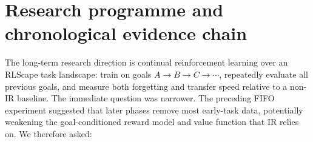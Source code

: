 \documentclass[10pt]{article}
\newcommand{\pct}[1]{#1\%}
\begin{document}
\begin{abstract}
Study XII autopsies that bury failure over 2,010 sampled episodes. Always-on reward-only IR raises success from \pct{34.0} to \pct{60.7}, and a 127-update cap reaches \pct{61.3}; caps of 16--80 updates instead fall to \pct{11.3}--\pct{20.7}. Randomly distributing at most 46 updates reaches \pct{54.0}, while the virtual-positive selector reaches exactly zero despite committing 48.6 updates per episode. Inverting its decision recovers only \pct{17.3}. An exact $\beta=.005$ value mixture is not a safe regularizer: always-on mixed IR also reaches zero, although random scheduling again reaches \pct{54.0}. Thus the catastrophe combines a partial-repair region with harmful selection and extreme seed sensitivity. A dedicated world-model audit does not pass its no-intervention check (only \pct{14.3} paired action agreement), so reward-model exploitation remains plausible but unproven. The combined result is a constructive negative: reward-only IR is a strong recovery operator, but the present world model cannot yet safely judge the real behavioral value of its own actor updates. Persistent Stage 5C adaptation remains deferred in favour of RNG-isolated model auditing, stronger performance estimation, uncertainty-aware acceptance, and hard update safety.
\end{abstract}

\tableofcontents
\clearpage

\section{Research programme and chronological evidence chain}

The long-term research direction is continual reinforcement learning over an RLScape task landscape: train on goals $A\rightarrow B\rightarrow C\rightarrow\cdots$, repeatedly evaluate all previous goals, and measure both forgetting and transfer speed relative to a non-IR baseline. The immediate question was narrower. The preceding FIFO experiment suggested that later phases remove most early-task data, potentially weakening the goal-conditioned reward model and value function that IR relies on. We therefore asked:
\end{document}
